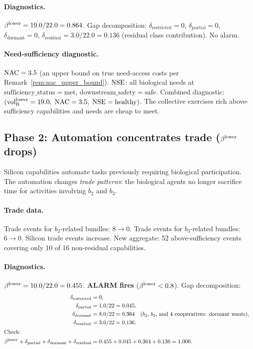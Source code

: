 \paragraph{Diagnostics.}
$\beta^{\mathrm{lower}} = 19.0 / 22.0 = 0.864$.  Gap decomposition:
$\delta_{\mathrm{restricted}} = 0$,
$\delta_{\mathrm{partial}} = 0$,
$\delta_{\mathrm{dormant}} = 0$,
$\delta_{\mathrm{residual}} = 3.0 / 22.0 = 0.136$ (residual
class contribution).  No alarm.

\paragraph{Need-sufficiency diagnostic.}
$\mathrm{NAC} = 3.5$ (an upper bound on true need-access costs per
Remark~\ref{rem:nac_upper_bound}).  $\mathrm{NSE}$: all biological
needs at $\mathrm{sufficiency\_status} = \mathrm{met}$,
$\mathrm{downstream\_safety} = \mathrm{safe}$.  Combined
diagnostic: $({\operatorname{vol}_{\mathrm{R}}^{\mathrm{lower}}} = 19.0,\; \mathrm{NAC} = 3.5,\; \mathrm{NSE} =
\text{healthy})$.  The collective exercises rich above-sufficiency
capabilities and needs are cheap to meet.

\subsection{Phase 2: Automation concentrates trade ($\beta^{\mathrm{lower}}$
drops)}

Silicon capabilities automate tasks previously requiring
biological participation.  The automation changes \emph{trade
patterns}: the biological agents no longer sacrifice time for
activities involving $b_2$ and $b_3$.

\paragraph{Trade data.}
Trade events for $b_2$-related bundles:
$8 \to 0$.  Trade events for $b_3$-related bundles: $6 \to 0$.
Silicon trade events increase.  New aggregate: 52
above-sufficiency events covering only 10 of 16 non-residual
capabilities.

\paragraph{Diagnostics.}
$\beta^{\mathrm{lower}} = 10.0 / 22.0 = 0.455$.  \textbf{ALARM fires}
($\beta^{\mathrm{lower}} < 0.8$).  Gap decomposition:
\begin{align*}
\delta_{\mathrm{restricted}} &= 0, \\
\delta_{\mathrm{partial}} &= 1.0/22 = 0.045, \\
\delta_{\mathrm{dormant}} &= 8.0/22 = 0.364 \quad
  \text{($b_2$, $b_3$, and 4 cooperatives: dormant wants)}, \\
\delta_{\mathrm{residual}} &= 3.0/22 = 0.136. \\
\intertext{Check:}
\beta^{\mathrm{lower}} + \delta_{\mathrm{partial}} + \delta_{\mathrm{dormant}}
  + \delta_{\mathrm{residual}} &= 0.455 + 0.045 + 0.364
  + 0.136 = 1.000.
\end{align*}

